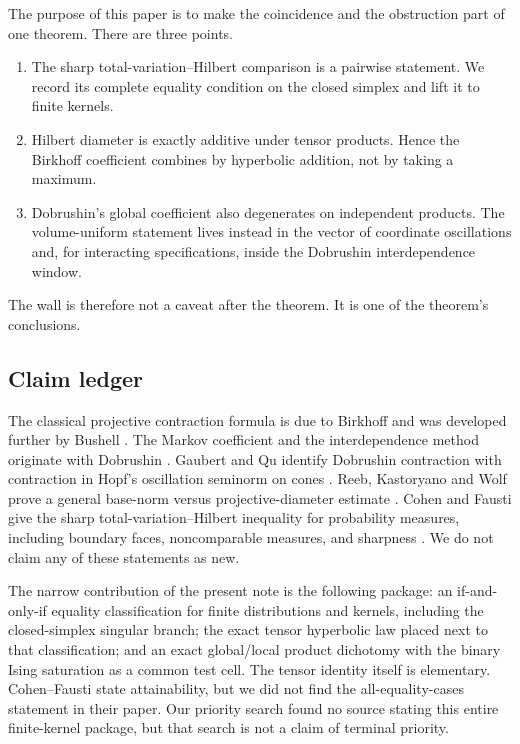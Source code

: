 \documentclass[11pt]{article}
\newcommand{\1}{\mathbf{1}}
\begin{document}
The purpose of this paper is to make the coincidence and the obstruction part
of one theorem.  There are three points.

\begin{enumerate}[label=(\roman*)]
\item The sharp total-variation--Hilbert comparison is a pairwise statement.
We record its complete equality condition on the closed simplex and lift it
to finite kernels.
\item Hilbert diameter is exactly additive under tensor products.  Hence the
Birkhoff coefficient combines by hyperbolic addition, not by taking a maximum.
\item Dobrushin's global coefficient also degenerates on independent products.
The volume-uniform statement lives instead in the vector of coordinate
oscillations and, for interacting specifications, inside the Dobrushin
interdependence window.
\end{enumerate}

The wall is therefore not a caveat after the theorem.  It is one of the
theorem's conclusions.

\subsection*{Claim ledger}

The classical projective contraction formula is due to Birkhoff
\cite{Birkhoff1957} and was developed further by Bushell
\cite{BushellRatio,BushellMetric}.  The Markov coefficient and the
interdependence method originate with Dobrushin
\cite{Dobrushin1956,Dobrushin1968,Dobrushin1970}.  Gaubert and Qu identify
Dobrushin contraction with contraction in Hopf's oscillation seminorm on
cones \cite{GaubertQu2014}.  Reeb, Kastoryano and Wolf prove a general
base-norm versus projective-diameter estimate
\cite{ReebKastoryanoWolf2011}.  Cohen and Fausti give the sharp
total-variation--Hilbert inequality for probability measures, including
boundary faces, noncomparable measures, and sharpness
\cite[Theorem~5.1 and Remark~15]{CohenFausti2024}.  We do not claim any of
these statements as new.

The narrow contribution of the present note is the following package: an
if-and-only-if equality classification for finite distributions and kernels,
including the closed-simplex singular branch; the exact tensor hyperbolic law
placed next to that classification; and an exact global/local product
dichotomy with the binary Ising saturation as a common test cell.  The tensor
identity itself is elementary.  Cohen--Fausti state attainability, but we did
not find the all-equality-cases statement in their paper.  Our priority search
found no source stating this entire finite-kernel package, but that search is
not a claim of terminal priority.
\end{document}
